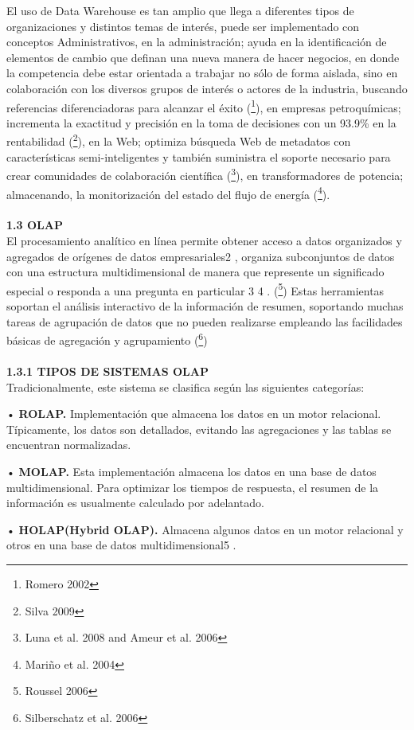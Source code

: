 \documentclass[a4paper,12pt,twocolumn]{article}
\begin{document}
El uso de Data Warehouse es tan amplio que llega a diferentes tipos de organizaciones y distintos temas de interés, puede ser implementado con conceptos Administrativos, en la administración; ayuda en la identificación de elementos de cambio que definan una nueva manera de hacer negocios, en donde la competencia debe estar orientada a trabajar no sólo de forma aislada, sino en colaboración con los diversos grupos de interés o actores de la industria, buscando referencias diferenciadoras para alcanzar el éxito (\footnote{Romero 2002}), en empresas petroquímicas; incrementa la exactitud y precisión en la toma de decisiones con un 93.9\% en la rentabilidad (\footnote{Silva 2009}), en la Web; optimiza búsqueda Web de metadatos con características semi-inteligentes y también suministra el soporte necesario para crear comunidades de colaboración científica (\footnote{Luna et al. 2008 and Ameur et al. 2006}), en transformadores de potencia; almacenando, la monitorización del estado del flujo de energía (\footnote{Mariño et al. 2004}).
\textbf{}\\
\textbf{}\\
\textbf{1.3 OLAP}\\
El procesamiento analítico en línea permite obtener acceso a datos organizados y agregados de orígenes de datos empresariales2 , organiza subconjuntos de datos con una estructura multidimensional de manera que represente un significado especial o responda a una pregunta en particular 3 4 . (\footnote{Roussel 2006}) Estas herramientas soportan el análisis interactivo de la información de resumen, soportando muchas tareas de agrupación de datos que no pueden realizarse empleando las facilidades básicas de agregación y agrupamiento (\footnote{Silberschatz et al. 2006})
\textbf{}\\
\textbf{}\\
\textbf{1.3.1 TIPOS DE SISTEMAS OLAP}\\
Tradicionalmente, este sistema se clasifica según las siguientes categorías: 
\item • \textbf{ROLAP.} Implementación que almacena los datos en un motor relacional. Típicamente, los datos son detallados, evitando las agregaciones y las tablas se encuentran normalizadas.
\item • \textbf{MOLAP.} Esta implementación almacena los datos en una base de datos multidimensional. Para optimizar los tiempos de respuesta, el resumen de la información es usualmente calculado por adelantado. 
\item • \textbf{ HOLAP(Hybrid OLAP).} Almacena algunos datos en un motor relacional y otros en una base de datos multidimensional5 .
\end{document}
